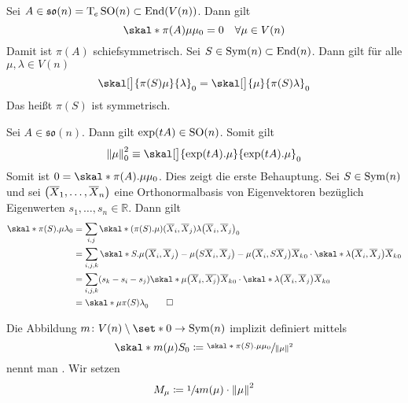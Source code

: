 \begin{lemma}[{name=[Eigenschaften der linearen Darstellung $\pi$]}]
	Sei $A \in \mathfrak{so}(n) = \Tmap_e \SO(n) \subset \End(V(n))$.
	Dann gilt 
	\[
		\skal*{\pi(A) \mu}{\mu}_0 = 0 \quad \forall \mu \in V(n)
	\]
	Damit ist $\pi(A)$ schiefsymmetrisch. Sei $S \in  \Sym(n) \subset \End(n)$.
	Dann gilt für alle $\mu,\lambda \in V(n)$
	\[
		\skal[\big]{\pi(S) \mu}{\lambda}_0 = \skal[\big]{\mu}{\pi(S)\lambda}_0
	\]
	Das heißt $\pi(S)$ ist symmetrisch.
\end{lemma}
\begin{beweis}
	Sei $A \in \mathfrak{so}(n)$.
	Dann gilt $\exp(t A) \in \SO(n)$.
	Somit gilt 
	\[
		\norm*{\mu}_0^2 \equiv \skal[\big]{\exp(t A). \mu}{ \exp(tA).\mu}_0
	\]
	Somit ist $0= \skal*{\pi(A).\mu}{\mu}_0$.
	Dies zeigt die erste Behauptung.
	Sei $S \in \Sym(n)$ und sei $\enbrace*{\overline{X}_1, \ldots , \overline{X}_n}$ eine Orthonormalbasis von Eigenvektoren bezüglich Eigenwerten $s_1, \ldots, s_n \in \mathbb{R}$.
	Dann gilt
	\begin{align}
		\skal*{\pi(S).\mu}{\lambda}_0 &= \sum_{i,j} \skal*{\enbrace*{\pi(S).\mu}(\overline{X}_i, \overline{X}_j)}{\lambda \enbrace*{\overline{X}_i, \overline{X}_j}}_0 \\
		&= \sum_{i,j,k} \skal*{S.\mu \enbrace*{\overline{X}_i, \overline{X}_j} - \mu \enbrace*{S \overline{X}_i, \overline{X}_j} - \mu \enbrace*{\overline{X}_i, S \overline{X}_j}}{\overline{X}_k}_0 \cdot \skal*{\lambda \enbrace*{\overline{X}_i, \overline{X}_j}}{\overline{X}_k}_0 \\
		&= \sum_{i,j,k} \enbrace*{s_k - s_i - s_j} \skal*{\mu \enbrace*{\overline{X}_i, \overline{X_j}}}{\overline{X}_k}_0 \cdot \skal*{\lambda \enbrace*{\overline{X}_i, \overline{X}_j}}{\overline{X}_k}_0 \\
		&= \skal*{\mu}{\pi(S) \lambda}_0 \qedhere
	\end{align}
\end{beweis}

\begin{definition}[{name=[Momentenabbildung]}]
	Die Abbildung $m \colon V(n) \setminus \set*{0} \to \Sym(n)$ implizit definiert mittels
	\[
		\skal*{m(\mu)}{S}_0 \coloneqq \sfrac{\skal*{\pi(S). \mu}{\mu}_0}{\norm*{\mu}^2}
	\]
	nennt man . Wir setzen
	\[
		M_\mu \coloneqq \sfrac{1}{4} m(\mu) \cdot \norm*{\mu}^2
	\]
\end{definition}

